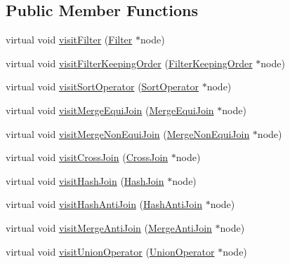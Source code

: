\subsection*{Public Member Functions}
\begin{DoxyCompactItemize}
\item 
virtual void \hyperlink{classrafe_1_1_physical_operator_visitor_a516a84d305910f3e1b9d1ae2cb184b24}{visit\+Filter} (\hyperlink{classrafe_1_1_filter}{Filter} $\ast$node)
\item 
virtual void \hyperlink{classrafe_1_1_physical_operator_visitor_a7b581054d167c71fa5443570a6808740}{visit\+Filter\+Keeping\+Order} (\hyperlink{classrafe_1_1_filter_keeping_order}{Filter\+Keeping\+Order} $\ast$node)
\item 
virtual void \hyperlink{classrafe_1_1_physical_operator_visitor_adaee48b1ef175226c860c7b2d70ba15d}{visit\+Sort\+Operator} (\hyperlink{classrafe_1_1_sort_operator}{Sort\+Operator} $\ast$node)
\item 
virtual void \hyperlink{classrafe_1_1_physical_operator_visitor_a9fd16981e6fbb9b545b7edeaabcf97bf}{visit\+Merge\+Equi\+Join} (\hyperlink{classrafe_1_1_merge_equi_join}{Merge\+Equi\+Join} $\ast$node)
\item 
virtual void \hyperlink{classrafe_1_1_physical_operator_visitor_a1d4af9c73ece300d7a90c65481cd8e06}{visit\+Merge\+Non\+Equi\+Join} (\hyperlink{classrafe_1_1_merge_non_equi_join}{Merge\+Non\+Equi\+Join} $\ast$node)
\item 
virtual void \hyperlink{classrafe_1_1_physical_operator_visitor_acc39509ae79aa6848ec928cc4f616d61}{visit\+Cross\+Join} (\hyperlink{classrafe_1_1_cross_join}{Cross\+Join} $\ast$node)
\item 
virtual void \hyperlink{classrafe_1_1_physical_operator_visitor_ae36c9ef817768f134d35fe5b3834855c}{visit\+Hash\+Join} (\hyperlink{classrafe_1_1_hash_join}{Hash\+Join} $\ast$node)
\item 
virtual void \hyperlink{classrafe_1_1_physical_operator_visitor_a9415b5939da4948ac922e63fbece1135}{visit\+Hash\+Anti\+Join} (\hyperlink{classrafe_1_1_hash_anti_join}{Hash\+Anti\+Join} $\ast$node)
\item 
virtual void \hyperlink{classrafe_1_1_physical_operator_visitor_a0f3496aaac992756bbb8f18c1000ed75}{visit\+Merge\+Anti\+Join} (\hyperlink{classrafe_1_1_merge_anti_join}{Merge\+Anti\+Join} $\ast$node)
\item 
virtual void \hyperlink{classrafe_1_1_physical_operator_visitor_a01eb10e07cc1fbe7622bc1eb01fa3b79}{visit\+Union\+Operator} (\hyperlink{classrafe_1_1_union_operator}{Union\+Operator} $\ast$node)

\end{DoxyCompactItemize}
